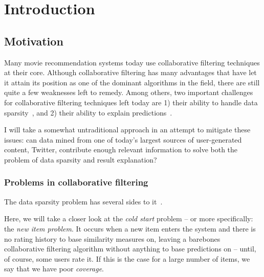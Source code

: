 
\chapter{Introduction} %

\label{Chapter1} %




\section{Motivation}

Many movie recommendation systems today use collaborative filtering techniques at their core. Although collaborative filtering has many advantages that have let it attain its position as one of the dominant algorithms in the field, there are still quite a few weaknesses left to remedy. Among others, two important challenges for collaborative filtering techniques left today are 1) their ability to handle data sparsity~\cite{Su:2009:SCF:1592474.1722966}, and 2) their ability to explain predictions~\cite{Herlocker:2000:ECF:358916.358995}.

I will take a somewhat untraditional approach in an attempt to mitigate these issues: can data mined from one of today's largest sources of user-generated content, Twitter, contribute enough relevant information to solve both the problem of data sparsity and result explanation?

\subsection{Problems in collaborative filtering}

The data sparsity problem has several sides to it~\cite{Su:2009:SCF:1592474.1722966}.

Here, we will take a closer look at the \emph{cold start} problem -- or more specifically: the \emph{new item problem}. It occurs when a new item enters the system and there is no rating history to base similarity measures on, leaving a barebones collaborative filtering algorithm without anything to base predictions on -- until, of course, some users rate it. If this is the case for a large number of items, we say that we have poor \emph{coverage}.

